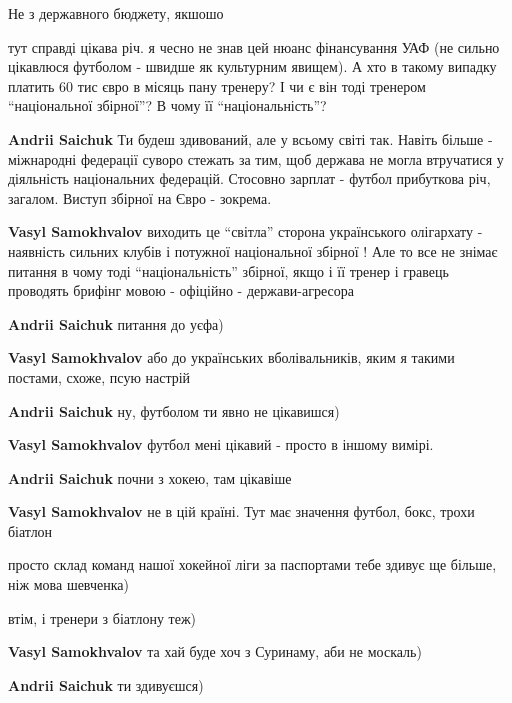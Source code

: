 \begin{itemize}
Не з державного бюджету, якшошо

\begin{itemize}

тут справді цікава річ. я чесно не знав цей нюанс фінансування УАФ (не сильно
цікавлюся футболом - швидше як культурним явищем). А хто в такому випадку
платить 60 тис євро в місяць пану тренеру? І чи є він тоді тренером
\enquote{національної збірної}? В чому її \enquote{національність}?

\textbf{Andrii Saichuk} Ти будеш здивований, але у всьому світі так. Навіть
більше - міжнародні федерації суворо стежать за тим, щоб держава не могла
втручатися у діяльність національних федерацій. Стосовно зарплат - футбол
прибуткова річ, загалом. Виступ збірної на Євро - зокрема.

\textbf{Vasyl Samokhvalov} виходить це \enquote{світла} сторона українського олігархату
- наявність сильних клубів і потужної національної збірної ! \Laughey[1.0] Але то все не
знімає питання в чому тоді \enquote{національність} збірної, якщо і її тренер і гравець
проводять брифінг мовою - офіційно - держави-агресора 🤷

\textbf{Andrii Saichuk} питання до уєфа)

\textbf{Vasyl Samokhvalov} або до українських вболівальників, яким я такими постами, схоже, псую настрій \Smiley[1.0][yellow]

\textbf{Andrii Saichuk} ну, футболом ти явно не цікавишся)

\textbf{Vasyl Samokhvalov} футбол мені цікавий - просто в іншому вимірі.

\textbf{Andrii Saichuk} почни з хокею, там цікавіше

\textbf{Vasyl Samokhvalov} не в цій країні. Тут має значення футбол, бокс, трохи біатлон

просто склад команд нашої хокейної ліги за паспортами тебе здивує ще більше, ніж мова шевченка)

втім, і тренери з біатлону теж)

\textbf{Vasyl Samokhvalov} та хай буде хоч з Суринаму, аби не москаль)

\textbf{Andrii Saichuk} ти здивуєшся)


\end{itemize}
\end{itemize}
